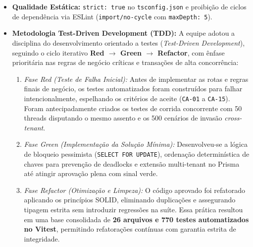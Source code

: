 \begin{itemize}
\begin{itemize}
\end{itemize}
\item \textbf{Qualidade Estática:} \texttt{strict: \allowbreak\hspace{0pt plus 1pt}true} no \texttt{tsconfig.\allowbreak\hspace{0pt plus 1pt}json} e proibição de ciclos de dependência via ESLint (\texttt{import/\allowbreak\hspace{0pt plus 1pt}no-\allowbreak\hspace{0pt plus 1pt}cycle} com \texttt{maxDepth: \allowbreak\hspace{0pt plus 1pt}5}).
\item \textbf{Metodologia Test-Driven Development (TDD):} A equipe adotou a disciplina do desenvolvimento orientado a testes (\emph{Test-Driven Development}), seguindo o ciclo iterativo \textbf{Red $\to$ Green $\to$ Refactor}, com ênfase prioritária nas regras de negócio críticas e transações de alta concorrência:
\begin{enumerate}
\item \emph{Fase Red (Teste de Falha Inicial):} Antes de implementar as rotas e regras finais de negócio, os testes automatizados foram construídos para falhar intencionalmente, espelhando os critérios de aceite (\texttt{CA-01} a \texttt{CA-15}). Foram antecipadamente criados os testes de corrida concorrente com 50 threads disputando o mesmo assento e os 500 cenários de invasão \emph{cross-tenant}.
\item \emph{Fase Green (Implementação da Solução Mínima):} Desenvolveu-se a lógica de bloqueio pessimista (\texttt{SELECT \allowbreak\hspace{0pt plus 1pt}FOR \allowbreak\hspace{0pt plus 1pt}UPDATE}), ordenação determinística de chaves para prevenção de deadlocks e extensão multi-tenant no Prisma até atingir aprovação plena com sinal verde.
\item \emph{Fase Refactor (Otimização e Limpeza):} O código aprovado foi refatorado aplicando os princípios SOLID, eliminando duplicações e assegurando tipagem estrita sem introduzir regressões na suíte. Essa prática resultou em uma base consolidada de \textbf{26 arquivos e 770 testes automatizados no Vitest}, permitindo refatorações contínuas com garantia estrita de integridade.
\end{enumerate}
\end{itemize}


